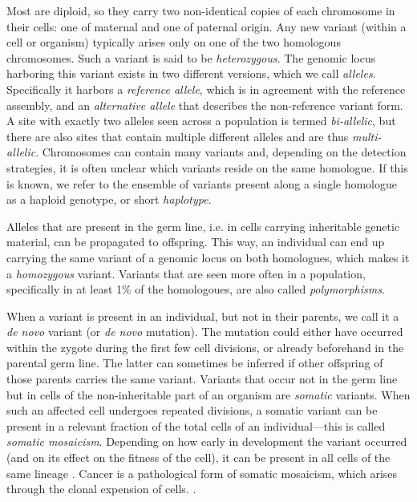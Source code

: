 Most  are diploid, so they carry two non-identical
copies of each chromosome in their cells: one of maternal and one of paternal origin. Any new
variant (within a cell or organism) typically arises only on one of the two
homologous chromosomes. Such a variant is said to be \emph{heterozygous}. The
genomic locus harboring this variant exists in two different versions, which we
call \emph{alleles}. Specifically it harbors a \emph{reference allele}, which is
in agreement with the reference assembly, and
an \emph{alternative allele} that describes the non-reference variant form. A
site with exactly two alleles seen across a population is termed
\emph{bi-allelic}, but there are also sites that contain multiple different
alleles and are thus \emph{multi-allelic}. Chromosomes can contain many variants
and, depending on the detection strategies, it is often unclear which variants
reside on the same homologue. If this is known, we refer to the ensemble of
variants present along a single homologue as a haploid genotype, or short
\emph{haplotype}.

Alleles that are present in the germ line, i.e. in cells
carrying inheritable genetic material, can be propagated to offspring. This way,
an individual can end up carrying the same variant of a genomic locus on both
homologues, which makes it a \emph{homozygous} variant. Variants that are seen
more often in a population, specifically in at least 1\% of the homologoues,
are also called \emph{polymorphisms}.

When a variant is present in an individual, but not in their parents, we call it
a \emph{de novo} variant (or \emph{de novo} mutation). The mutation could
either have occurred within the
zygote during the first few cell divisions, or already beforehand in the
parental germ line. The latter can sometimes be inferred if other offspring of
those parents carries the same variant. Variants that occur not in the germ line
but in cells of the non-inheritable part of an organism are \emph{somatic}
variants. When such an affected cell undergoes repeated divisions, a somatic variant
can be present in a relevant fraction of the total cells of an individual---this
is called \emph{somatic mosaicism}. Depending on how early in development the
variant occurred (and on its effect on the fitness of the cell), it can be present in all cells of the
same lineage \citep{Youssoufian2002}. Cancer is a pathological form of somatic
mosaicism, which arises through the clonal expension of cells. \citep{Campbell2007}.


